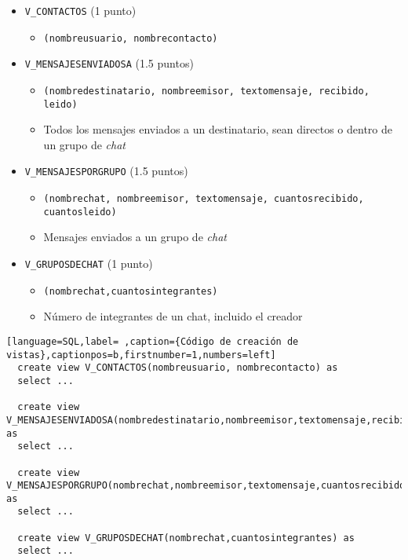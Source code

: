 \documentclass[a4paper]{article}
\begin{document}
\begin{itemize}
\item \texttt{V\_CONTACTOS} (1 punto)
\begin{itemize}
\item \texttt{(nombreusuario, nombrecontacto)}
\end{itemize}
\item \texttt{V\_MENSAJESENVIADOSA} (1.5 puntos)
\begin{itemize}
\item \texttt{(nombredestinatario, nombreemisor, textomensaje, recibido, leido)}
\item Todos los mensajes enviados a un destinatario, sean directos o dentro de un grupo de \emph{chat}
\end{itemize}
\item \texttt{V\_MENSAJESPORGRUPO} (1.5 puntos)
\begin{itemize}
\item \texttt{(nombrechat, nombreemisor, textomensaje, cuantosrecibido, cuantosleido)}
\item Mensajes enviados a un grupo de \emph{chat}
\end{itemize}
\item \texttt{V\_GRUPOSDECHAT} (1 punto)
\begin{itemize}
\item \texttt{(nombrechat,cuantosintegrantes)}
\item Número de integrantes de un chat, incluido el creador
\end{itemize}
\end{itemize}

\begin{lstlisting}[language=SQL,label= ,caption={Código de creación de vistas},captionpos=b,firstnumber=1,numbers=left]
  create view V_CONTACTOS(nombreusuario, nombrecontacto) as
  select ...
  
  create view V_MENSAJESENVIADOSA(nombredestinatario,nombreemisor,textomensaje,recibido,leido) as
  select ...
  
  create view V_MENSAJESPORGRUPO(nombrechat,nombreemisor,textomensaje,cuantosrecibido,cuantosleido) as
  select ...
    
  create view V_GRUPOSDECHAT(nombrechat,cuantosintegrantes) as
  select ...
\end{lstlisting}
\end{document}
